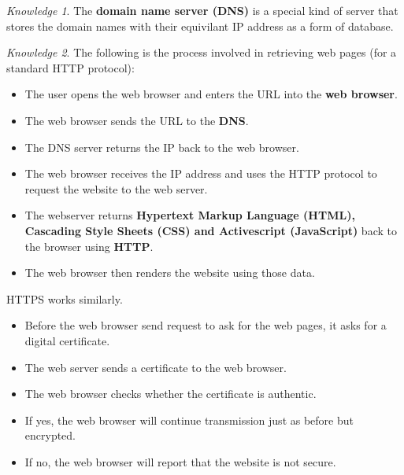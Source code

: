 \documentclass[8pt]{article}
\theoremstyle{remark}
\newtheorem{knowledge}{Knowledge}[subsection]
\begin{document}
            \begin{knowledge}
                The \textbf{domain name server (DNS)} is a special kind of server that stores the domain names with their equivilant IP address as a form of database.
            \end{knowledge}

            \begin{knowledge}
                The following is the process involved in retrieving web pages (for a standard HTTP protocol):
                \begin{itemize}
                    \item The user opens the web browser and enters the URL into the \textbf{web browser}.
                    \item The web browser sends the URL to the \textbf{DNS}.
                    \item The DNS server returns the IP back to the web browser.
                    \item The web browser receives the IP address and uses the HTTP protocol to request the website to the web server.
                    \item The webserver returns \textbf{Hypertext Markup Language (HTML), Cascading Style Sheets (CSS) and Activescript (JavaScript)} back to the browser using \textbf{HTTP}.
                    \item The web browser then renders the website using those data.
                \end{itemize}

                HTTPS works similarly.
                \begin{itemize}
                    \item Before the web browser send request to ask for the web pages, it asks for a digital certificate.
                    \item The web server sends a certificate to the web browser.
                    \item The web browser checks whether the certificate is authentic.
                    \item If yes, the web browser will continue transmission just as before but encrypted.
                    \item If no, the web browser will report that the website is not secure.
                \end{itemize}
            \end{knowledge}
\end{document}
